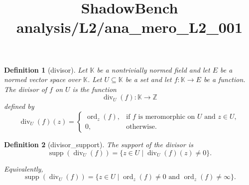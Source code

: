 \documentclass{article}
\title{ShadowBench analysis/L2/ana\_mero\_L2\_001}
\newtheorem{definition}{Definition}
\begin{document}
\maketitle

\begin{definition}[divisor] Let $\mathbb K$ be a nontrivially normed field and let $E$ be a normed vector space over $\mathbb K$.
Let $U \subseteq \mathbb K$ be a set and let $f : \mathbb K \to E$ be a function. The \emph{divisor} of $f$ on $U$ is the function
\[
\operatorname{div}_U(f) : \mathbb K \longrightarrow \mathbb{Z}
\]
defined by
\[
\operatorname{div}_U(f)(z)
=
\begin{cases}
\operatorname{ord}_z(f), & \text{if $f$ is meromorphic on $U$ and $z \in U$},\\[6pt]
0, & \text{otherwise}.
\end{cases}
\]
\end{definition}


\begin{definition}[divisor_support]
The \emph{support} of the divisor is
\[
\operatorname{supp}(\operatorname{div}_U(f))
=
\{ z \in U \mid \operatorname{div}_U(f)(z) \neq 0 \}.
\]

Equivalently,
\[
\operatorname{supp}(\operatorname{div}_U(f))
=
\{ z \in U \mid \operatorname{ord}_z(f) \neq 0 \text{ and } \operatorname{ord}_z(f) \neq \infty \}.
\]
\end{definition}
\end{document}
